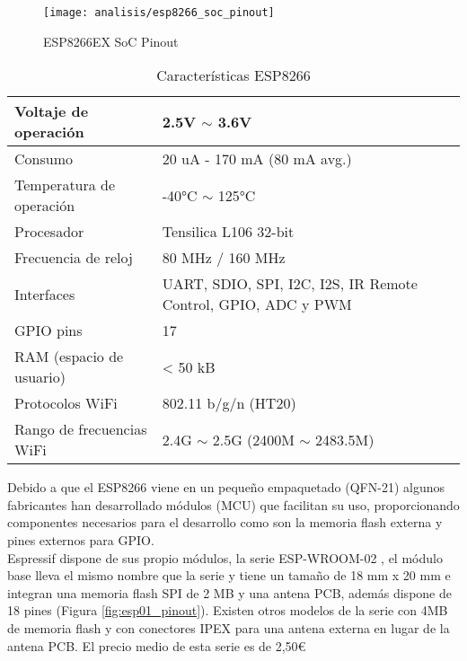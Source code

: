 \documentclass[../proyecto.tex]{subfiles}
\begin{document}
\begin{figure}[H]
\centering
\texttt{[image: analisis/esp8266\_soc\_pinout]}
\caption{ESP8266EX SoC Pinout}
\label{fig:esp8266_soc_pinout}
\end{figure}

\begin{table}[H]
\centering
\begin{tabular}{ |l|m{20em}| }
\hline
Voltaje de operación      & 2.5V $\sim$ 3.6V          \\ \hline
Consumo                   & 20 uA - 170 mA (80 mA avg.)  \\ \hline
Temperatura de operación  & -40°C $\sim$ 125°C        \\ \hline
Procesador                & Tensilica L106 32-bit     \\ \hline
Frecuencia de reloj       & 80 MHz / 160 MHz          \\ \hline
Interfaces                & UART, SDIO, SPI, I2C, I2S, IR Remote Control, GPIO, ADC y PWM                           \\ \hline
GPIO pins                 & 17                        \\ \hline
RAM (espacio de usuario)  & < 50 kB                     \\ \hline
Protocolos WiFi           & 802.11 b/g/n (HT20)       \\ \hline
Rango de frecuencias WiFi & 2.4G $\sim$ 2.5G (2400M $\sim$ 2483.5M) \\ \hline
\end{tabular}
\caption{Características ESP8266}
\label{table:caracteristicas_esp8266}
\end{table}

Debido a que el ESP8266 viene en un pequeño empaquetado (QFN-21) algunos fabricantes han desarrollado módulos (MCU) que facilitan su uso, proporcionando componentes necesarios para el desarrollo como son la memoria flash externa y pines externos para GPIO.\\

Espressif dispone de sus propio módulos, la serie ESP-WROOM-02 \cite{espwroom02_overview}, el módulo base \cite{espwroom02_datasheet} lleva el mismo nombre que la serie y tiene un tamaño de 18 mm x 20 mm e integran una memoria flash SPI de 2 MB y una antena PCB, además dispone de 18 pines (Figura \ref{fig:esp01_pinout}). Existen otros modelos de la serie con 4MB de memoria flash y con conectores IPEX para una antena externa en lugar de la antena PCB. El precio medio de esta serie es de 2,50€ \cite{espressif_provider_digikey} \cite{espressif_provider_mouser}\\
\end{document}
